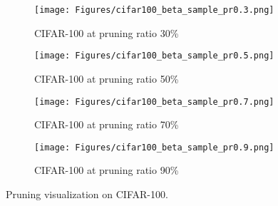 \begin{figure}[htbp] 
    \centering
    \begin{subfigure}{0.6\textwidth}
        \centering
        \texttt{[image: Figures/cifar100\_beta\_sample\_pr0.3.png]}
        \caption{CIFAR-100 at pruning ratio 30\%}
        \label{fig:cifar_beta_pr30}
    \end{subfigure}

    \begin{subfigure}{0.6\textwidth}
        \centering
        \texttt{[image: Figures/cifar100\_beta\_sample\_pr0.5.png]} 
        \caption{CIFAR-100 at pruning ratio 50\%}
        \label{fig:cifar_beta_pr50}
    \end{subfigure}
    
    \begin{subfigure}{0.6\textwidth}
        \centering
        \texttt{[image: Figures/cifar100\_beta\_sample\_pr0.7.png]} 
        \caption{CIFAR-100 at pruning ratio 70\%}
        \label{fig:cifar_beta_pr70}
    \end{subfigure}

    \begin{subfigure}{0.6\textwidth}
        \centering
        \texttt{[image: Figures/cifar100\_beta\_sample\_pr0.9.png]} 
        \caption{CIFAR-100 at pruning ratio 90\%}
        \label{fig:cifar_beta_pr90}
    \end{subfigure}

    \caption{Pruning visualization on CIFAR-100.}
    \label{fig:cifar_coreset_visualization_beta}
\end{figure}
\clearpage

